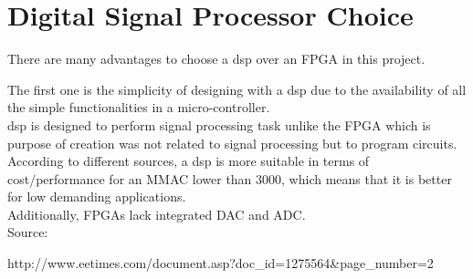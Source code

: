 \section{Digital Signal Processor Choice}

There are many advantages to choose a \gls{dsp} over an FPGA in this project. 

The first one is the simplicity of designing with a \gls{dsp} due to the availability of all the simple functionalities in a micro-controller. \\

\gls{dsp} is designed to perform signal processing task unlike the FPGA which is purpose of creation was not related to signal processing but to program circuits. \\

According to different sources, a \gls{dsp} is more suitable in terms of cost/performance for an MMAC lower than 3000, which means that it is better for low demanding applications. \\

Additionally, FPGAs lack integrated DAC and ADC. \\

Source:

http://www.eetimes.com/document.asp?doc_id=1275564&page_number=2
